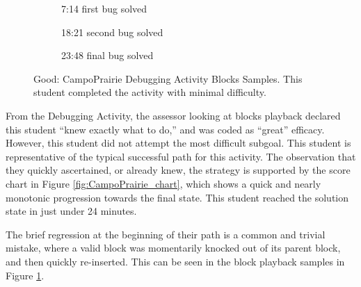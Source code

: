 \begin{figure}
\begin{subfigure}{.45\textwidth}
		\caption{7:14 first bug solved} 
	\end{subfigure}\hfill
	\begin{subfigure}{.45\textwidth}
		\caption{18:21 second bug solved} 
	\end{subfigure}\hfill
	\begin{subfigure}{.45\textwidth}
		\caption{23:48 final bug solved} 
	\end{subfigure}

	\caption[Good: CampoPrairie Debugging Activity Blocks Samples]{Good: CampoPrairie Debugging Activity Blocks Samples. This student completed the activity with minimal difficulty.}
	\label{fig:CampoPrairie_blocks}
\end{figure}

From the Debugging Activity, the assessor looking at blocks playback declared this student ``knew exactly what to do,'' and was coded as ``great'' efficacy. However, this student did not attempt the most difficult subgoal. This student is representative of the typical successful path for this activity. The observation that they quickly ascertained, or already knew, the strategy is supported by the score chart in Figure \ref{fig:CampoPrairie_chart}, which shows a quick and nearly monotonic progression towards the final state. This student reached the solution state in just under 24 minutes.

The brief regression at the beginning of their path is a common and trivial mistake, where a valid block was momentarily knocked out of its parent block, and then quickly re-inserted. This can be seen in the block playback samples in Figure \ref{fig:CampoPrairie_blocks}.


